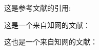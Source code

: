 \documentclass{ctexart}
\begin{document}
	
	这是参考文献的引用:\cite{mittelbach2004}
	\cite{Razavi2001}
	\cite{NIPS1999_01e00f2f}
	\cite{NIPS1999_6449f44a}
	
	这是一个来自知网的文献：\cite{noauthor_content_2022}
	
	这也是一个来自知网的文献：\cite{graham_daily_2022}
	\nocite{*}
	
\end{document}
